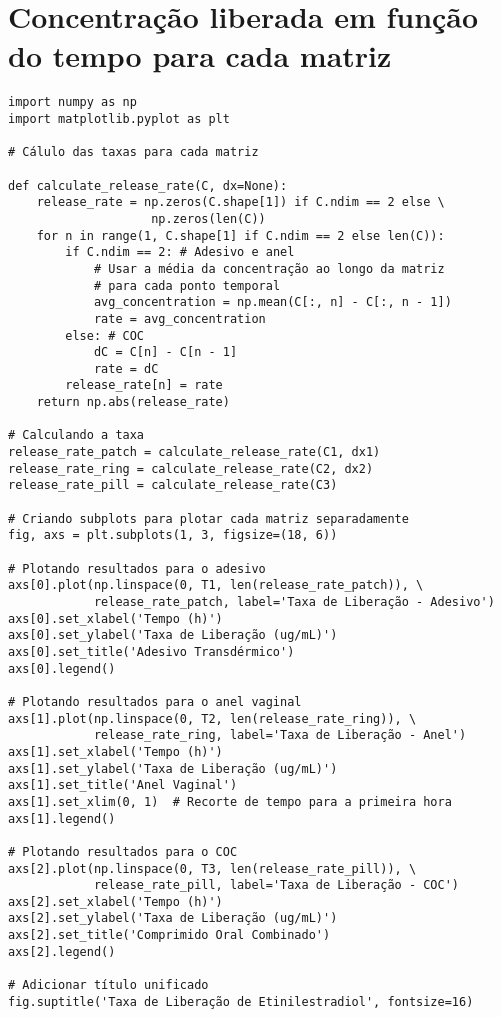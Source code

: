 \section{Concentração liberada em função do tempo para cada matriz}

\begin{verbatim}
import numpy as np
import matplotlib.pyplot as plt

# Cálulo das taxas para cada matriz

def calculate_release_rate(C, dx=None):
    release_rate = np.zeros(C.shape[1]) if C.ndim == 2 else \
                    np.zeros(len(C))
    for n in range(1, C.shape[1] if C.ndim == 2 else len(C)):
        if C.ndim == 2: # Adesivo e anel
            # Usar a média da concentração ao longo da matriz 
            # para cada ponto temporal
            avg_concentration = np.mean(C[:, n] - C[:, n - 1])
            rate = avg_concentration
        else: # COC
            dC = C[n] - C[n - 1]
            rate = dC
        release_rate[n] = rate
    return np.abs(release_rate)

# Calculando a taxa
release_rate_patch = calculate_release_rate(C1, dx1)
release_rate_ring = calculate_release_rate(C2, dx2)
release_rate_pill = calculate_release_rate(C3)

# Criando subplots para plotar cada matriz separadamente
fig, axs = plt.subplots(1, 3, figsize=(18, 6))

# Plotando resultados para o adesivo
axs[0].plot(np.linspace(0, T1, len(release_rate_patch)), \
            release_rate_patch, label='Taxa de Liberação - Adesivo')
axs[0].set_xlabel('Tempo (h)')
axs[0].set_ylabel('Taxa de Liberação (ug/mL)')
axs[0].set_title('Adesivo Transdérmico')
axs[0].legend()

# Plotando resultados para o anel vaginal
axs[1].plot(np.linspace(0, T2, len(release_rate_ring)), \
            release_rate_ring, label='Taxa de Liberação - Anel')
axs[1].set_xlabel('Tempo (h)')
axs[1].set_ylabel('Taxa de Liberação (ug/mL)')
axs[1].set_title('Anel Vaginal')
axs[1].set_xlim(0, 1)  # Recorte de tempo para a primeira hora
axs[1].legend()

# Plotando resultados para o COC
axs[2].plot(np.linspace(0, T3, len(release_rate_pill)), \
            release_rate_pill, label='Taxa de Liberação - COC')
axs[2].set_xlabel('Tempo (h)')
axs[2].set_ylabel('Taxa de Liberação (ug/mL)')
axs[2].set_title('Comprimido Oral Combinado')
axs[2].legend()

# Adicionar título unificado
fig.suptitle('Taxa de Liberação de Etinilestradiol', fontsize=16)


\end{verbatim}
